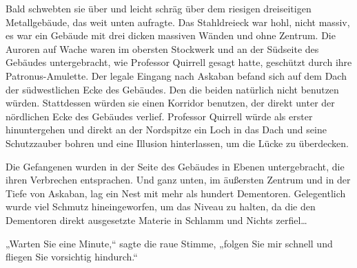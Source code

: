 Bald schwebten sie über und leicht schräg über dem riesigen dreiseitigen Metallgebäude, das weit unten aufragte. Das Stahldreieck war hohl, nicht massiv, es war ein Gebäude mit drei dicken massiven Wänden und ohne Zentrum. Die Auroren auf Wache waren im obersten Stockwerk und an der Südseite des Gebäudes untergebracht, wie Professor Quirrell gesagt hatte, geschützt durch ihre Patronus-Amulette. Der legale Eingang nach Askaban befand sich auf dem Dach der südwestlichen Ecke des Gebäudes. Den die beiden natürlich nicht benutzen würden. Stattdessen würden sie einen Korridor benutzen, der direkt unter der nördlichen Ecke des Gebäudes verlief. Professor Quirrell würde als erster hinuntergehen und direkt an der Nordspitze ein Loch in das Dach und seine Schutzzauber bohren und eine Illusion hinterlassen, um die Lücke zu überdecken.

Die Gefangenen wurden in der Seite des Gebäudes in Ebenen untergebracht, die ihren Verbrechen entsprachen. Und ganz unten, im äußersten Zentrum und in der Tiefe von Askaban, lag ein Nest mit mehr als hundert Dementoren. Gelegentlich wurde viel Schmutz hineingeworfen, um das Niveau zu halten, da die den Dementoren direkt ausgesetzte Materie in Schlamm und Nichts zerfiel…

„Warten Sie eine Minute,“ sagte die raue Stimme, „folgen Sie mir schnell und fliegen Sie vorsichtig hindurch.“

